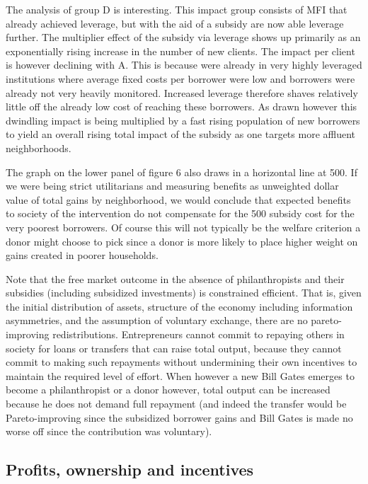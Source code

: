 \documentclass[letterpaper, 12pt]{article}
\begin{document}
The analysis of group D is interesting. This impact group consists of
MFI that already achieved leverage, but with the aid of a subsidy are
now able leverage further. The multiplier effect of the subsidy via
leverage shows up primarily as an exponentially rising increase in the
number of new clients. The impact per client is however declining with
\(\text{A.}\) This is because were already in very highly leveraged
institutions where average fixed costs per borrower were low and
borrowers were already not very heavily monitored. Increased leverage
therefore shaves relatively little off the already low cost of reaching
these borrowers. As drawn however this dwindling impact is being
multiplied by a fast rising population of new borrowers to yield an
overall rising total impact of the subsidy as one targets more affluent
neighborhoods.

The graph on the lower panel of figure 6 also draws in a horizontal line
at 500. If we were being strict utilitarians and measuring benefits as
unweighted dollar value of total gains by neighborhood, we would
conclude that expected benefits to society of the intervention do not
compensate for the 500 subsidy cost for the very poorest borrowers. Of
course this will not typically be the welfare criterion a donor might
choose to pick since a donor is more likely to place higher weight on
gains created in poorer households.

Note that the free market outcome in the absence of philanthropists and
their subsidies (including subsidized investments) is constrained
efficient. That is, given the initial distribution of assets, structure
of the economy including information asymmetries, and the assumption of
voluntary exchange, there are no pareto-improving redistributions.
Entrepreneurs cannot commit to repaying others in society for loans or
transfers that can raise total output, because they cannot commit to
making such repayments without undermining their own incentives to
maintain the required level of effort. When however a new Bill Gates
emerges to become a philanthropist or a donor however, total output can
be increased because he does not demand full repayment (and indeed the
transfer would be Pareto-improving since the subsidized borrower gains
and Bill Gates is made no worse off since the contribution was
voluntary).


\subsection{Profits, ownership and incentives}\label{profits-ownership-and-incentives}
\end{document}
